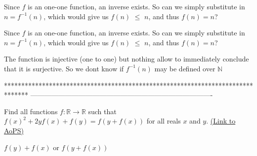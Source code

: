 \begin{solution}
	Since $f$ is an one-one function, an inverse exists. So can we simply substitute in 
$n=f^{-1}(n)$, which would give us $f(n)$ $\le$ $n$, and thus $f(n)=n$?
\end{solution}



\begin{solution}
	\begin{tcolorbox}Since $f$ is an one-one function, an inverse exists. So can we simply substitute in 
$n=f^{-1}(n)$, which would give us $f(n)$ $\le$ $n$, and thus $f(n)=n$?\end{tcolorbox}
The function is injective (one to one) but nothing allow to immediately conclude that it is surjective.
So we dont know if $f^{-1}(n)$ may be defined over $\mathbb N$
\end{solution}
*******************************************************************************
-------------------------------------------------------------------------------

\begin{problem}
	Find all functions $f: \mathbb R \to \mathbb R$ such that $f(x)^2 +2yf(x)+f(y)=f(y+f(x))$ for all reals $x$ and $y$.
	\flushright \href{https://artofproblemsolving.com/community/c6h389373}{(Link to AoPS)}
\end{problem}



\begin{solution}
	$f(y)+f(x)$ or $f(y+f(x))$
\end{solution}



